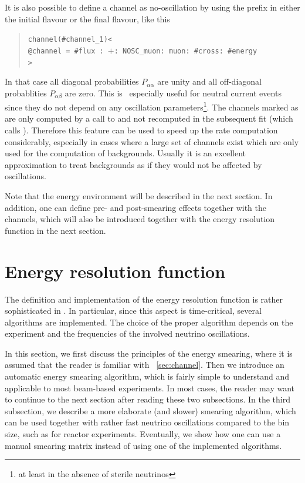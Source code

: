 It is also possible to define a channel as no-oscillation by using the
prefix  in either the initial  flavour or 
the final flavour, like this
\begin{quote}
{\tt channel(\#channel\_1)<\\
\tb @channel = \#flux : $+$: NOSC\_muon: muon: \#cross: \#energy\\
>}
\end{quote}

 In that case
all diagonal probabilities $P_{\alpha\alpha}$ are unity and all off-diagonal
probablities  $P_{\alpha\beta}$ are zero. This is \eg\ especially useful for
neutral current events since they do not depend on any oscillation 
parameters\footnote{at least in the absence of sterile neutrinos}. The channels
marked as  are only computed by a call to 
and not recomputed in the subsequent fit (which calls ).
Therefore this feature can be used to speed up the rate 
computation considerably, especially in cases where a large set
of channels exist which are only used for the computation of backgrounds.
Usually it is an excellent approximation to treat backgrounds as if they
would not be affected by oscillations.



Note that the energy environment will be described in the next section. 
In addition, one can define pre- and post-smearing effects together
with the channels, which will also be introduced together with the
energy resolution function in the next section.


\section{Energy resolution function}
\label{sec:energy}

The definition and implementation of the energy resolution function is 
rather sophisticated in \GLOBES . In particular, since this aspect is 
 time-critical, several algorithms are implemented. The choice of the 
proper algorithm depends on the experiment and the frequencies of the
 involved neutrino oscillations.

In this section, we first discuss the principles of the energy smearing, where it is assumed that the reader is familiar with \Sec~\ref{sec:channel}. Then we introduce an automatic energy smearing algorithm, which is fairly simple to understand and applicable to most beam-based experiments. 
In most cases, the reader may want to continue to the next section after reading these two subsections. In the third subsection, we describe a more elaborate (and slower) smearing algorithm, which can be used together with rather fast neutrino oscillations compared to the bin size, such as for reactor experiments. Eventually, we show how one can use a manual smearing matrix instead of using one of the implemented algorithms.

